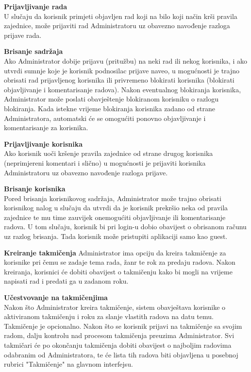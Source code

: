 \documentclass[12pt, a4paper]{report}
\begin{document}
\begin{flushleft}
\textbf{Prijavljivanje rada} \\
U slučaju da korisnik primjeti objavljen rad koji na bilo koji način krši pravila zajednice, može prijaviti rad Administratoru uz obavezno navođenje razloga prijave rada. \newline

\textbf{Brisanje sadržaja} \\
Ako Administrator dobije prijavu (pritužbu) na neki rad ili nekog korisnika, i ako utvrdi sumnje koje je korisnik podnosilac prijave naveo, u mogućnosti je trajno obrisati rad prijavljenog korisnika ili privremeno blokirati korisnika (blokirati objavljivanje i komentarisanje radova). Nakon eventualnog blokiranja korisnika, Administrator može poslati obavještenje blokiranom korisniku o razlogu blokiranja. Kada istekne vrijeme blokiranja korisnika zadano od strane Administratora, automatski će se omogućiti ponovno objavljivanje i komentarisanje za korisnika. \newline

\textbf{Prijavljivanje korisnika} \\
Ako korisnik uoči kršenje pravila zajednice od strane drugog korisnika (neprimjereni komentari i slično) u mogućnosti je prijaviti korisnika Administratoru uz obavezno navođenje razloga prijave. \newline

\textbf{Brisanje korisnika} \\
Pored brisanja korisnikovog sadržaja, Administrator može trajno obrisati korisnikog nalog u slučaju da utvrdi da je korisnik prekršio neka od pravila zajednice te mu time zauvijek onemogućiti objavljivanje ili komentarisanje radova. U tom slučaju, korisnik bi pri login-u dobio obavijest o obrisanom računu uz razlog brisanja. Tada korisnik može pristupiti aplikaciji samo kao guest. \newline

\textbf{Kreiranje takmičenja}
Administrator ima opciju da kreira takmičenje za korisnike pri čemu se zadaje tema rada, žanr te rok za predaju radova. Nakon kreiranja, korisnici će dobiti obavijest o takmičenju kako bi mogli na vrijeme napisati rad i predati ga u zadanom roku. \newline

\textbf{Učestvovanje na takmičenjima} \\
Nakon što Administrator kreira takmičenje, sistem obavještava korisnike o aktiviranom takmičenju i roku za slanje vlastith radova na datu temu. Takmičenje je opcionalno. Nakon što se korisnik prijavi na takmičenje sa svojim radom, dalju kontrolu nad procesom takmičenja preuzima Administrator. Svi takmičari će po okončanju takmičenja dobiti obavijest o najboljim radovima odabranim od Administratora, te će lista tih radova biti objavljena u posebnoj rubrici "Takmičenje" na glavnom interfejsu. \newline


\end{flushleft}
\end{document}
